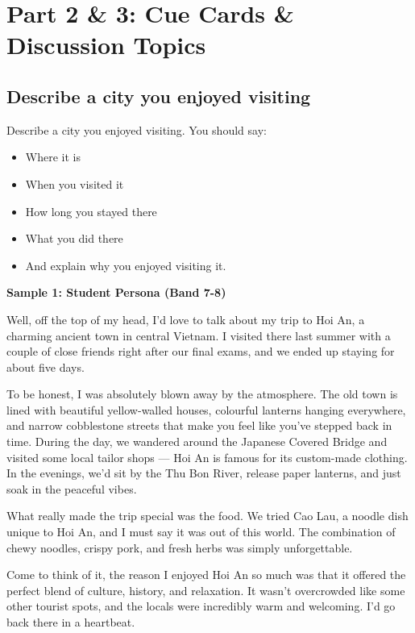 \chapter{Part 2 \& 3: Cue Cards \& Discussion Topics}

\section{Describe a city you enjoyed visiting}
\begin{ieltsprompt}
Describe a city you enjoyed visiting.
You should say:
\begin{itemize}[leftmargin=2em, itemsep=2pt]
\item Where it is
\item When you visited it
\item How long you stayed there
\item What you did there
\item And explain why you enjoyed visiting it.
\end{itemize}
\end{ieltsprompt}
\begin{ieltsanswer}
\textbf{Sample 1: Student Persona (Band 7-8)}

Well, off the top of my head, I'd love to talk about my trip to Hoi An, a charming ancient town in central Vietnam. I visited there last summer with a couple of close friends right after our final exams, and we ended up staying for about five days.

To be honest, I was absolutely blown away by the atmosphere. The old town is lined with beautiful yellow-walled houses, colourful lanterns hanging everywhere, and narrow cobblestone streets that make you feel like you've stepped back in time. During the day, we wandered around the Japanese Covered Bridge and visited some local tailor shops — Hoi An is famous for its custom-made clothing. In the evenings, we'd sit by the Thu Bon River, release paper lanterns, and just soak in the peaceful vibes.

What really made the trip special was the food. We tried Cao Lau, a noodle dish unique to Hoi An, and I must say it was out of this world. The combination of chewy noodles, crispy pork, and fresh herbs was simply unforgettable.

Come to think of it, the reason I enjoyed Hoi An so much was that it offered the perfect blend of culture, history, and relaxation. It wasn't overcrowded like some other tourist spots, and the locals were incredibly warm and welcoming. I'd go back there in a heartbeat.
\end{ieltsanswer}


